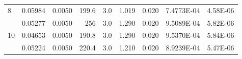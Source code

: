 \documentclass[a4paper,11pt]{article}
\begin{document}
\begin{table}[]
\begin{tabular}{lrrrrrrrr}
				\multicolumn{1}{l|}{\cellcolor[HTML]{BBDAFF}8}  & \multicolumn{1}{r|}{\cellcolor[HTML]{EFEFEF}0.05984}              & \multicolumn{1}{r|}{\cellcolor[HTML]{EFEFEF}0.0050} & \multicolumn{1}{r|}{\cellcolor[HTML]{EFEFEF}199.6}                        & \multicolumn{1}{r|}{\cellcolor[HTML]{EFEFEF}3.0}       & \multicolumn{1}{r|}{\cellcolor[HTML]{EFEFEF}1.019}               & \multicolumn{1}{r|}{\cellcolor[HTML]{EFEFEF}0.020}     & \multicolumn{1}{r|}{\cellcolor[HTML]{EFEFEF}7.4773E-04}                  & \multicolumn{1}{r|}{\cellcolor[HTML]{EFEFEF}4.58E-06}  \\ \cline{2-9} 
				\rowcolor[HTML]{C0C0C0} 
				\multicolumn{1}{l|}{\cellcolor[HTML]{BBDAFF}9}  & \multicolumn{1}{r|}{\cellcolor[HTML]{C0C0C0}0.05277}              & \multicolumn{1}{r|}{\cellcolor[HTML]{C0C0C0}0.0050} & \multicolumn{1}{r|}{\cellcolor[HTML]{C0C0C0}256}                          & \multicolumn{1}{r|}{\cellcolor[HTML]{C0C0C0}3.0}       & \multicolumn{1}{r|}{\cellcolor[HTML]{C0C0C0}1.290}               & \multicolumn{1}{r|}{\cellcolor[HTML]{C0C0C0}0.020}     & \multicolumn{1}{r|}{\cellcolor[HTML]{C0C0C0}9.5089E-04}                  & \multicolumn{1}{r|}{\cellcolor[HTML]{C0C0C0}5.82E-06}  \\ \cline{2-9} 
				\multicolumn{1}{l|}{\cellcolor[HTML]{BBDAFF}10} & \multicolumn{1}{r|}{\cellcolor[HTML]{EFEFEF}0.04653}              & \multicolumn{1}{r|}{\cellcolor[HTML]{EFEFEF}0.0050} & \multicolumn{1}{r|}{\cellcolor[HTML]{EFEFEF}190.8}                        & \multicolumn{1}{r|}{\cellcolor[HTML]{EFEFEF}3.0}       & \multicolumn{1}{r|}{\cellcolor[HTML]{EFEFEF}1.290}               & \multicolumn{1}{r|}{\cellcolor[HTML]{EFEFEF}0.020}     & \multicolumn{1}{r|}{\cellcolor[HTML]{EFEFEF}9.5370E-04}                  & \multicolumn{1}{r|}{\cellcolor[HTML]{EFEFEF}5.84E-06}  \\ \cline{2-9} 
				\rowcolor[HTML]{C0C0C0} 
				\multicolumn{1}{l|}{\cellcolor[HTML]{BBDAFF}11} & \multicolumn{1}{r|}{\cellcolor[HTML]{C0C0C0}0.05224}              & \multicolumn{1}{r|}{\cellcolor[HTML]{C0C0C0}0.0050} & \multicolumn{1}{r|}{\cellcolor[HTML]{C0C0C0}220.4}                        & \multicolumn{1}{r|}{\cellcolor[HTML]{C0C0C0}3.0}       & \multicolumn{1}{r|}{\cellcolor[HTML]{C0C0C0}1.210}               & \multicolumn{1}{r|}{\cellcolor[HTML]{C0C0C0}0.020}     & \multicolumn{1}{r|}{\cellcolor[HTML]{C0C0C0}8.9239E-04}                  & \multicolumn{1}{r|}{\cellcolor[HTML]{C0C0C0}5.47E-06}  \\ \cline{2-9} 
				
			\end{tabular}
		\end{table}
		
\end{document}
